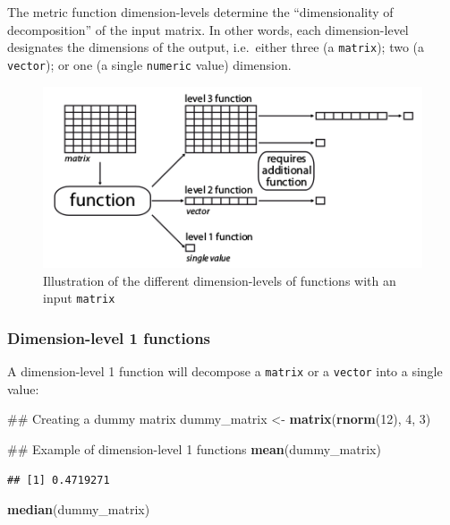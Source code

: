 \documentclass[]{book}
\newenvironment{Shaded}{\begin{snugshade}}{\end{snugshade}}
\newcommand{\KeywordTok}[1]{\textcolor[rgb]{0.13,0.29,0.53}{\textbf{#1}}}
\newcommand{\DecValTok}[1]{\textcolor[rgb]{0.00,0.00,0.81}{#1}}
\newcommand{\StringTok}[1]{\textcolor[rgb]{0.31,0.60,0.02}{#1}}
\newcommand{\NormalTok}[1]{#1}
\theoremstyle{definition}
\theoremstyle{definition}
\theoremstyle{definition}
\theoremstyle{remark}
\begin{document}
The metric function dimension-levels determine the ``dimensionality of
decomposition'' of the input matrix. In other words, each
dimension-level designates the dimensions of the output, i.e.~either
three (a \texttt{matrix}); two (a \texttt{vector}); or one (a single
\texttt{numeric} value) dimension.

\begin{figure}
\centering
\includegraphics{dispRity_fun.png}
\caption{Illustration of the different dimension-levels of functions
with an input \texttt{matrix}}
\end{figure}

\subsubsection{Dimension-level 1
functions}\label{dimension-level-1-functions}

A dimension-level 1 function will decompose a \texttt{matrix} or a
\texttt{vector} into a single value:

\begin{Shaded}
\begin{Highlighting}[]
\NormalTok{## Creating a dummy matrix}
\NormalTok{dummy_matrix <-}\StringTok{ }\KeywordTok{matrix}\NormalTok{(}\KeywordTok{rnorm}\NormalTok{(}\DecValTok{12}\NormalTok{), }\DecValTok{4}\NormalTok{, }\DecValTok{3}\NormalTok{)}

\NormalTok{## Example of dimension-level 1 functions}
\KeywordTok{mean}\NormalTok{(dummy_matrix)}
\end{Highlighting}
\end{Shaded}

\begin{verbatim}
## [1] 0.4719271
\end{verbatim}

\begin{Shaded}
\begin{Highlighting}[]
\KeywordTok{median}\NormalTok{(dummy_matrix)}
\end{Highlighting}
\end{Shaded}
\end{document}
